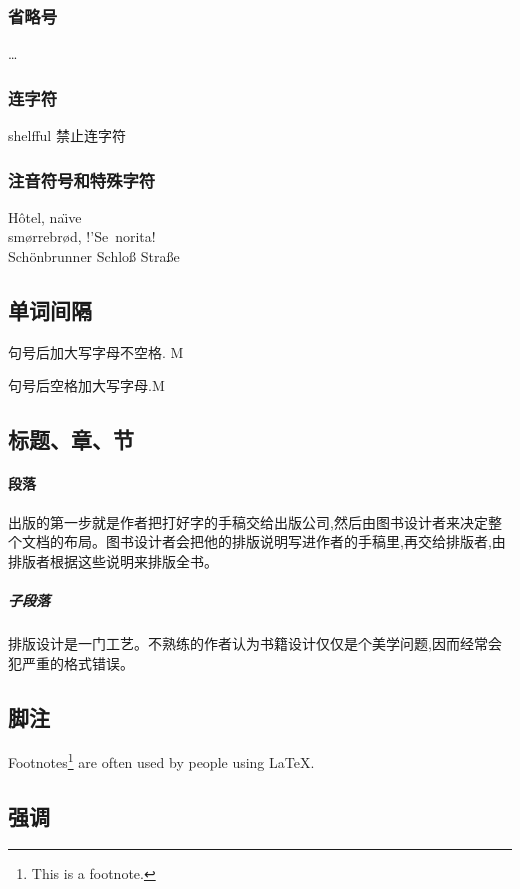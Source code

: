 \documentclass[a4paper,12pt]{article}
\begin{document}
\texteuro

\subsubsection{省略号}

\ldots

\subsubsection{连字符}

shelf\mbox{}ful  禁止连字符

\subsubsection{注音符号和特殊字符}

H\^otel, na\"\i ve\\
sm\o rrebr\o d, !'Se\ norita!\\
Sch\"onbrunner Schlo\ss{}
Stra\ss e

\subsection{单词间隔}

句号后加大写字母不空格. M

句号后空格加大写字母.M

\subsection{标题、章、节}

\paragraph{段落}
出版的第一步就是作者把打好字的手稿交给出版公司,然后由图书设计者来决定整个文档的布局。图书设计者会把他的排版说明写进作者的手稿里,再交给排版者,由排版者根据这些说明来排版全书。

\subparagraph{子段落}
排版设计是一门工艺。不熟练的作者认为书籍设计仅仅是个美学问题,因而经常会犯严重的格式错误。

\subsection{脚注}

Footnotes\footnote{This is a footnote.} are often used by people using \LaTeX.

\subsection{强调}
\end{document}

